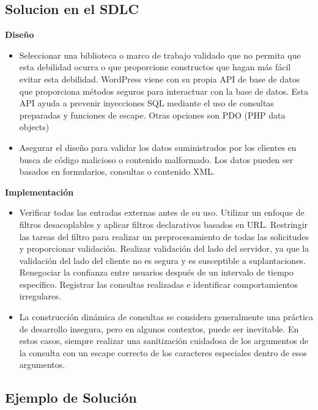 \subsection*{Solucion en el SDLC}

\textbf{Diseño}

\begin{itemize}
    \item Seleccionar una biblioteca o marco de trabajo validado que no permita que esta debilidad ocurra o que proporcione constructos que hagan más fácil evitar esta debilidad. WordPress viene con su propia API de base de datos que proporciona métodos seguros para interactuar con la base de datos. Esta API ayuda a prevenir inyecciones SQL mediante el uso de consultas preparadas y funciones de escape. Otras opciones son PDO (PHP data objects) 
    \item Asegurar el diseño para validar los datos suministrados por los clientes en busca de código malicioso o contenido malformado. Los datos pueden ser basados en formularios, consultas o contenido XML.


\end{itemize}

\textbf{Implementación}

\begin{itemize}
    \item Verificar todas las entradas externas antes de su uso. Utilizar un enfoque de filtros desacoplables y aplicar filtros declarativos basados en URL. Restringir las tareas del filtro para realizar un preprocesamiento de todas las solicitudes y proporcionar validación. Realizar validación del lado del servidor, ya que la validación del lado del cliente no es segura y es susceptible a suplantaciones. Renegociar la confianza entre usuarios después de un intervalo de tiempo específico. Registrar las consultas realizadas e identificar comportamientos irregulares.
    \item La construcción dinámica de consultas se considera generalmente una práctica de desarrollo insegura, pero en algunos contextos, puede ser inevitable. En estos casos, siempre realizar una sanitización cuidadosa de los argumentos de la consulta con un escape correcto de los caracteres especiales dentro de esos argumentos.
\end{itemize}


\subsection*{Ejemplo de Solución}

